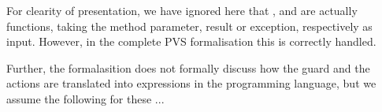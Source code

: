 For clearity of presentation, we have ignored here that \preset, \postset and
\excset are actually functions, taking the method parameter, result or
exception, respectively as input. However, in the complete PVS
formalisation this is correctly handled. 

Further, the formalasition does not formally discuss how the guard and
the actions are translated into expressions in the programming
language, but we assume the following for these
...






